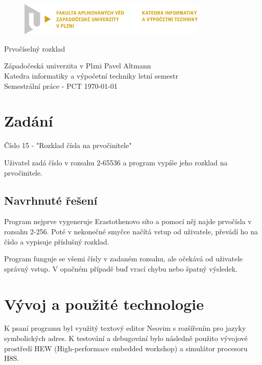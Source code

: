 \documentclass[12pt]{article}
\begin{document}
\begin{figure}[h!]
	\centering
	\includegraphics[width=0.8\textwidth]{pic/LOGO_KIV_CMYK.png}
\end{figure}

\begin{center}
	\vspace{.5cm}
	\LARGE{Prvočíselný rozklad}\\
\end{center}

\vfill

\noindent
Západočeská univerzita v Plzni \hfill Pavel Altmann\\
Katedra informatiky a výpočetní techniky \hfill letní semestr\\
Semestrální práce - PCT \hfill \today
\thispagestyle{empty}

\newpage
\setcounter{page}{1}

\tableofcontents

\newpage

\section{Zadání}

Číslo 15 - "Rozklad čísla na prvočinitele"

Uživatel zadá číslo v rozsahu 2-65536 a program vypíše jeho rozklad na prvočinitele.

\subsection{Navrhnuté řešení}

Program nejprve vygeneruje Erastothenovo síto a pomocí něj najde prvočísla v rozsahu 2-256.
Poté v nekonečné smyčce načítá vstup od uživatele, převádí ho na číslo a vypisuje příslušný
rozklad.

Program funguje se všemi čísly v zadaném rozsahu, ale očekává od uživatele správný vstup.
V opačném případě buď vrací chybu nebo špatný výsledek.

\section{Vývoj a použité technologie}

K psaní programu byl využitý textový editor Neovim s rozšířením pro jazyky symbolických
adres. K testování a debugování bylo následně použito vývojové prostředí HEW (High-performace
embedded workshop) a simulátor procesoru H8S.
\end{document}

